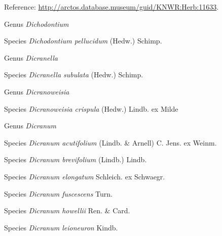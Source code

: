 \documentclass[9pt, article]{memoir}
\begin{document}
\begin{multicols}{2}
\vspace{6pt}Reference: 
\url{http://arctos.database.museum/guid/KNWR:Herb:11633}.

\vspace{6pt}\noindent\hspace{30pt}Genus \textit{Dichodontium}


\vspace{6pt}\noindent\hspace{36pt}Species \textit{Dichodontium pellucidum} (Hedw.) Schimp.


\vspace{6pt}\noindent\hspace{30pt}Genus \textit{Dicranella}


\vspace{6pt}\noindent\hspace{36pt}Species \textit{Dicranella subulata} (Hedw.) Schimp.


\vspace{6pt}\noindent\hspace{30pt}Genus \textit{Dicranoweisia}


\vspace{6pt}\noindent\hspace{36pt}Species \textit{Dicranoweisia crispula} (Hedw.) Lindb. ex Milde


\vspace{6pt}\noindent\hspace{30pt}Genus \textit{Dicranum}


\vspace{6pt}\noindent\hspace{36pt}Species \textit{Dicranum acutifolium} (Lindb. \& Arnell) C. Jens. ex Weinm.


\vspace{6pt}\noindent\hspace{36pt}Species \textit{Dicranum brevifolium} (Lindb.) Lindb.


\vspace{6pt}\noindent\hspace{36pt}Species \textit{Dicranum elongatum} Schleich. ex Schwaegr.


\vspace{6pt}\noindent\hspace{36pt}Species \textit{Dicranum fuscescens} Turn.


\vspace{6pt}\noindent\hspace{36pt}Species \textit{Dicranum howellii} Ren. \& Card.


\vspace{6pt}\noindent\hspace{36pt}Species \textit{Dicranum leioneuron} Kindb.



\end{multicols}
\end{document}
